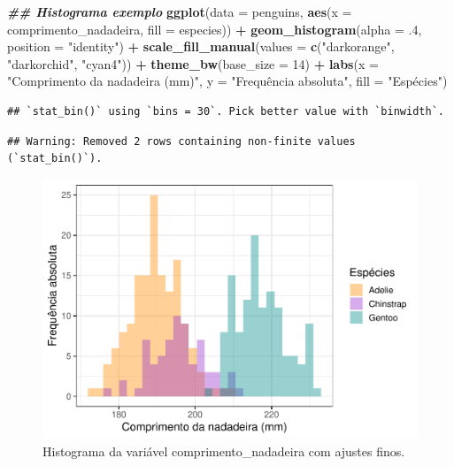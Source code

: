 \documentclass[
]{article}
\newenvironment{Shaded}{\begin{snugshade}}{\end{snugshade}}
\newcommand{\AttributeTok}[1]{\textcolor[rgb]{0.13,0.29,0.53}{#1}}
\newcommand{\DecValTok}[1]{\textcolor[rgb]{0.00,0.00,0.81}{#1}}
\newcommand{\DocumentationTok}[1]{\textcolor[rgb]{0.56,0.35,0.01}{\textbf{\textit{#1}}}}
\newcommand{\FunctionTok}[1]{\textcolor[rgb]{0.13,0.29,0.53}{\textbf{#1}}}
\newcommand{\NormalTok}[1]{#1}
\newcommand{\SpecialCharTok}[1]{\textcolor[rgb]{0.81,0.36,0.00}{\textbf{#1}}}
\newcommand{\StringTok}[1]{\textcolor[rgb]{0.31,0.60,0.02}{#1}}
\begin{document}
\begin{Shaded}
\begin{Highlighting}[]
\DocumentationTok{\#\# Histograma exemplo}
\FunctionTok{ggplot}\NormalTok{(}\AttributeTok{data =}\NormalTok{ penguins, }\FunctionTok{aes}\NormalTok{(}\AttributeTok{x =}\NormalTok{ comprimento\_nadadeira, }\AttributeTok{fill =}\NormalTok{ especies)) }\SpecialCharTok{+}
    \FunctionTok{geom\_histogram}\NormalTok{(}\AttributeTok{alpha =}\NormalTok{ .}\DecValTok{4}\NormalTok{, }\AttributeTok{position =} \StringTok{"identity"}\NormalTok{) }\SpecialCharTok{+}
    \FunctionTok{scale\_fill\_manual}\NormalTok{(}\AttributeTok{values =} \FunctionTok{c}\NormalTok{(}\StringTok{"darkorange"}\NormalTok{, }\StringTok{"darkorchid"}\NormalTok{, }\StringTok{"cyan4"}\NormalTok{)) }\SpecialCharTok{+}
    \FunctionTok{theme\_bw}\NormalTok{(}\AttributeTok{base\_size =} \DecValTok{14}\NormalTok{) }\SpecialCharTok{+}
    \FunctionTok{labs}\NormalTok{(}\AttributeTok{x =} \StringTok{"Comprimento da nadadeira (mm)"}\NormalTok{, }
         \AttributeTok{y =} \StringTok{"Frequência absoluta"}\NormalTok{, }\AttributeTok{fill =} \StringTok{"Espécies"}\NormalTok{)}
\end{Highlighting}
\end{Shaded}

\begin{verbatim}
## `stat_bin()` using `bins = 30`. Pick better value with `binwidth`.
\end{verbatim}

\begin{verbatim}
## Warning: Removed 2 rows containing non-finite values (`stat_bin()`).
\end{verbatim}

\begin{figure}
\includegraphics[width=0.75\linewidth,height=0.75\textheight]{epr_files/figure-latex/fig-hist-fino-1} \caption{Histograma da variável comprimento_nadadeira com ajustes finos.}\label{fig:fig-hist-fino}
\end{figure}
\end{document}
